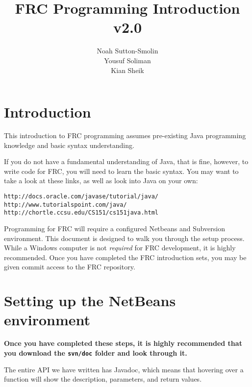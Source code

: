 \documentclass[a4paper]{article}
\title{FRC Programming Introduction v2.0}
\author{Noah Sutton-Smolin\\Yousuf Soliman\\Kian Sheik}
\begin{document}
\maketitle

\section{Introduction}

This introduction to FRC programming assumes pre-existing Java programming knowledge and basic syntax understanding.

If you do not have a fundamental understanding of Java, that is fine, however, to write code for FRC, you will need to learn the basic syntax. You may want to take a look at these links, as well as look into Java on your own:

\begin{lstlisting}
http://docs.oracle.com/javase/tutorial/java/
http://www.tutorialspoint.com/java/
http://chortle.ccsu.edu/CS151/cs151java.html
\end{lstlisting}

Programming for FRC will require a configured Netbeans and Subversion environment. This document is designed to walk you through the setup process. While a Windows computer is not \textit{required} for FRC development, it is highly recommended. Once you have completed the FRC introduction sets, you may be given commit access to the FRC repository.

\section{Setting up the NetBeans environment}

\textbf{Once you have completed these steps, it is highly recommended that you download the \lstinline{svn/doc} folder and look through it.}

The entire API we have written has Javadoc, which means that hovering over a function will show the description, parameters, and return values.
\end{document}
